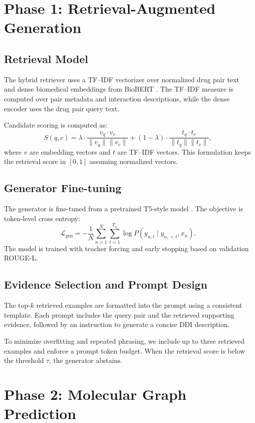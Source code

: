 \documentclass[conference]{IEEEtran}
\begin{document}
\section{Phase 1: Retrieval-Augmented Generation}
\subsection{Retrieval Model}
The hybrid retriever uses a TF--IDF vectorizer over normalized drug pair text and dense biomedical embeddings from BioBERT \cite{lee2020biobert}. The TF--IDF measure is computed over pair metadata and interaction descriptions, while the dense encoder uses the drug pair query text.

Candidate scoring is computed as:
\begin{equation}
    S(q,c) = \lambda \cdot \frac{v_q \cdot v_c}{\|v_q\|\|v_c\|} + (1-\lambda) \cdot \frac{t_q \cdot t_c}{\|t_q\|\|t_c\|},
\end{equation}
where $v$ are embedding vectors and $t$ are TF--IDF vectors. This formulation keeps the retrieval score in $[0,1]$ assuming normalized vectors.

\subsection{Generator Fine-tuning}
The generator is fine-tuned from a pretrained T5-style model \cite{raffel2020t5}. The objective is token-level cross entropy:
\begin{equation}
    \mathcal{L}_{\text{gen}} = -\frac{1}{N} \sum_{n=1}^{N} \sum_{t=1}^{T_n} \log P(y_{n,t} \mid y_{n,<t}, x_n).
\end{equation}
The model is trained with teacher forcing and early stopping based on validation ROUGE-L.

\subsection{Evidence Selection and Prompt Design}
The top-$k$ retrieved examples are formatted into the prompt using a consistent template. Each prompt includes the query pair and the retrieved supporting evidence, followed by an instruction to generate a concise DDI description.

To minimize overfitting and repeated phrasing, we include up to three retrieved examples and enforce a prompt token budget. When the retrieval score is below the threshold $\tau$, the generator abstains.

\section{Phase 2: Molecular Graph Prediction}
\end{document}
